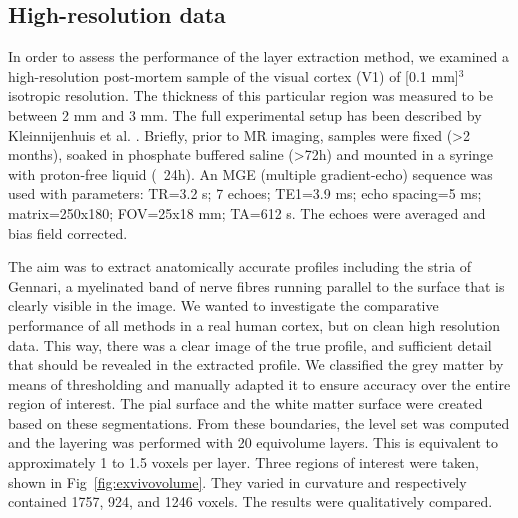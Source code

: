 \subsection{High-resolution data}
In order to assess the performance of the layer extraction method, we examined a high-resolution post-mortem sample of the visual cortex (V1) of [0.1 mm]$^3$ isotropic resolution. The thickness of this particular region was measured to be between 2 mm and 3 mm. The full experimental setup has been described by Kleinnijenhuis et al. \cite{Kleinnijenhuis2013}. Briefly, prior to MR imaging, samples were fixed (>2 months), soaked in phosphate buffered saline (>72h) and mounted in a syringe with proton-free liquid (~24h). An MGE (multiple gradient-echo) sequence was used with parameters: TR=3.2 s; 7 echoes; TE1=3.9 ms; echo spacing=5 ms; matrix=250x180; FOV=25x18 mm; TA=612 s. The echoes were averaged and bias field corrected.

The aim was to extract anatomically accurate profiles including the stria of Gennari, a myelinated band of nerve fibres running parallel to the surface that is clearly visible in the image. We wanted to investigate the comparative performance of all methods in a real human cortex, but on clean high resolution data. This way, there was a clear image of the true profile, and sufficient detail that should be revealed in the extracted profile. We classified the grey matter by means of thresholding and manually adapted it to ensure accuracy over the entire region of interest. The pial surface and the white matter surface were created based on these segmentations. From these boundaries, the level set was computed and the layering was performed with 20 equivolume layers. This is equivalent to approximately 1 to 1.5 voxels per layer. Three regions of interest were taken, shown in Fig~\ref{fig:exvivovolume}. They varied in curvature and respectively contained 1757, 924, and 1246 voxels. The results were qualitatively compared. 

